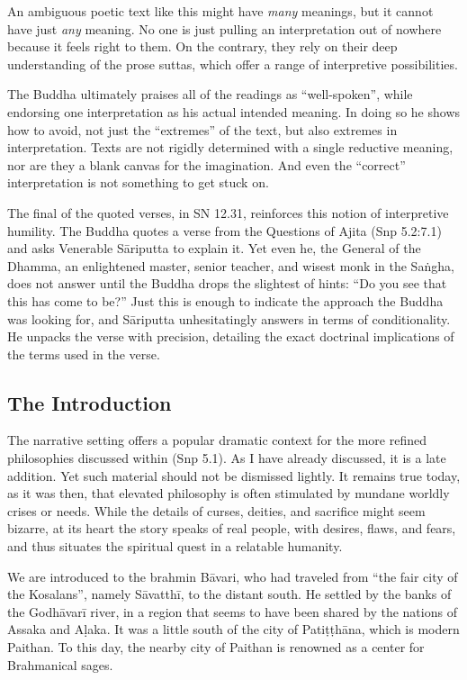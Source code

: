 \documentclass[12pt,openany]{book}%
\begin{document}
An ambiguous poetic text like this might have \emph{many} meanings, but it cannot have just \emph{any} meaning. No one is just pulling an interpretation out of nowhere because it feels right to them. On the contrary, they rely on their deep understanding of the prose suttas, which offer a range of interpretive possibilities.

The Buddha ultimately praises all of the readings as “well-spoken”, while endorsing one interpretation as his actual intended meaning. In doing so he shows how to avoid, not just the “extremes” of the text, but also extremes in interpretation. Texts are not rigidly determined with a single reductive meaning, nor are they a blank canvas for the imagination. And even the “correct” interpretation is not something to get stuck on.

The final of the quoted verses, in SN 12.31, reinforces this notion of interpretive humility. The Buddha quotes a verse from the Questions of Ajita (Snp 5.2:7.1) and asks Venerable \textsanskrit{Sāriputta} to explain it. Yet even he, the General of the Dhamma, an enlightened master, senior teacher, and wisest monk in the \textsanskrit{Saṅgha}, does not answer until the Buddha drops the slightest of hints: “Do you see that this has come to be?” Just this is enough to indicate the approach the Buddha was looking for, and \textsanskrit{Sāriputta} unhesitatingly answers in terms of conditionality. He unpacks the verse with precision, detailing the exact doctrinal implications of the terms used in the verse.

\subsection*{The Introduction}

The narrative setting offers a popular dramatic context for the more refined philosophies discussed within (Snp 5.1). As I have already discussed, it is a late addition. Yet such material should not be dismissed lightly. It remains true today, as it was then, that elevated philosophy is often stimulated by mundane worldly crises or needs. While the details of curses, deities, and sacrifice might seem bizarre, at its heart the story speaks of real people, with desires, flaws, and fears, and thus situates the spiritual quest in a relatable humanity.

We are introduced to the brahmin \textsanskrit{Bāvari}, who had traveled from “the fair city of the Kosalans”, namely \textsanskrit{Sāvatthī}, to the distant south. He settled by the banks of the \textsanskrit{Godhāvarī} river, in a region that seems to have been shared by the nations of Assaka and \textsanskrit{Aḷaka}. It was a little south of the city of \textsanskrit{Patiṭṭhāna}, which is modern Paithan. To this day, the nearby city of Paithan is renowned as a center for Brahmanical sages.
\end{document}
